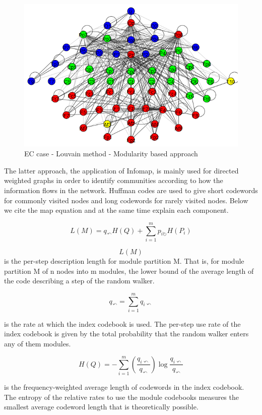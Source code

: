 \documentclass[%
 aip,
 jmp,%
 amsmath,amssymb,
 reprint,%
]{revtex4-1}
\begin{document}
\begin{figure}
	\centering
	\includegraphics[width=0.7\linewidth]{../liouvain_closed}
	\caption{EC case - Louvain method - Modularity based approach}
	\label{fig:liouvainclosed}
\end{figure}

The latter approach, the application of Infomap, is mainly used for directed weighted graphs in order to identify communities according to how the information flows in the network. Huffman codes are used to give short codewords for commonly visited nodes and long codewords for rarely visited nodes. Below we cite the map equation and at the same time explain each component\cite{black}.


\begin{equation}
	L(M) = q_{\curvearrowleft} H(Q) + \sum_{i=1}^{m} p_{i \circlearrowright} H(P_i)
\end{equation}


\[ 	L(M)  \]
is the per-step description length for module partition M. That is, for module partition M of n nodes into m modules, the lower bound of the average length of
the code describing a step of the random walker.

\[ 	q_{\curvearrowleft} = \sum_{i=1}^{m} q_{i\curvearrowleft} \]

is the rate at which the index codebook is used. The per-step use rate of the index
codebook is given by the total probability that the random walker enters any of
them modules.

\[ 	H(Q) = - \sum_{i=1}^{m}\left(\frac{ q_{i\curvearrowleft}}{ q_{\curvearrowleft}} \right) \log \frac{ q_{i\curvearrowleft}}{ q_{\curvearrowleft}} \]

is the frequency-weighted average length of codewords in the index codebook.
The entropy of the relative rates to use the module codebooks measures the
smallest average codeword length that is theoretically possible.
\end{document}
